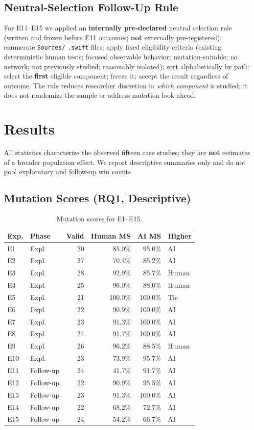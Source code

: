\documentclass[10pt,conference]{IEEEtran}
\begin{document}
\subsection{Neutral-Selection Follow-Up Rule}
For E11--E15 we applied an \textbf{internally pre-declared} neutral selection rule (written and frozen before E11 outcomes; \textbf{not} externally pre-registered): enumerate \texttt{Sources/} \texttt{.swift} files; apply fixed eligibility criteria (existing deterministic human tests; focused observable behavior; mutation-suitable; no network; not previously studied; reasonably isolated); sort alphabetically by path; select the \textbf{first} eligible component; freeze it; accept the result regardless of outcome. The rule reduces researcher discretion in \emph{which component} is studied; it does not randomize the sample or address mutation look-ahead.

\section{Results}
All statistics characterize the observed fifteen case studies; they are \textbf{not} estimates of a broader population effect. We report descriptive summaries only and do not pool exploratory and follow-up win counts.

\subsection{Mutation Scores (RQ1, Descriptive)}
\begin{table}[t]
\centering
\caption{Mutation scores for E1--E15.}
\label{tab:ms}
\small
\setlength{\tabcolsep}{3.5pt}
\begin{tabular}{@{}llrrrl@{}}
\toprule
Exp. & Phase & Valid & Human MS & AI MS & Higher \\
\midrule
E1 & Expl. & 20 & 85.0\% & 95.0\% & AI \\
E2 & Expl. & 27 & 70.4\% & 85.2\% & AI \\
E3 & Expl. & 28 & 92.9\% & 85.7\% & Human \\
E4 & Expl. & 25 & 96.0\% & 88.0\% & Human \\
E5 & Expl. & 21 & 100.0\% & 100.0\% & Tie \\
E6 & Expl. & 22 & 90.9\% & 100.0\% & AI \\
E7 & Expl. & 23 & 91.3\% & 100.0\% & AI \\
E8 & Expl. & 24 & 91.7\% & 100.0\% & AI \\
E9 & Expl. & 26 & 96.2\% & 88.5\% & Human \\
E10 & Expl. & 23 & 73.9\% & 95.7\% & AI \\
E11 & Follow-up & 24 & 41.7\% & 91.7\% & AI \\
E12 & Follow-up & 22 & 90.9\% & 95.5\% & AI \\
E13 & Follow-up & 23 & 91.3\% & 100.0\% & AI \\
E14 & Follow-up & 22 & 68.2\% & 72.7\% & AI \\
E15 & Follow-up & 24 & 54.2\% & 66.7\% & AI \\
\bottomrule
\end{tabular}
\end{table}
\end{document}
